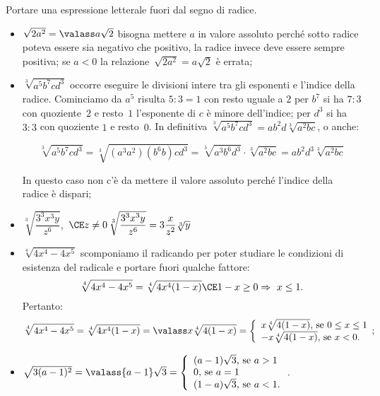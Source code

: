 \begin{exrig}
 \begin{esempio}
 Portare una espressione letterale fuori dal segno di radice.
\begin{itemize}
 \item $\sqrt{2a^2}=\valass a\sqrt 2$ bisogna mettere $a$ in valore assoluto 
 perché sotto radice poteva essere sia negativo che positivo, la radice invece 
 deve essere sempre positiva; se $a<0$ la relazione~$\sqrt{2a^2}=a\sqrt 2$ è 
 errata;
 \item $\sqrt[3]{a^5b^7cd^3}$ occorre eseguire le divisioni intere tra gli 
 esponenti e l'indice della radice. Cominciamo da $a^5$ risulta $5:3 = 1$ con 
 resto uguale a $2$ per $b^7$ si ha $7:3$ con quoziente~$2$ e resto~$1$ 
 l'esponente di $c$ è minore dell'indice; per $d^3$ si ha $3:3$ con quoziente 
 $1$ e resto~$0$. In definitiva 
 $\sqrt[3]{a^5b^7cd^3}={ab}^2 d\sqrt[3]{a^2{bc}}$, o anche:
 
\[\sqrt[3]{a^5b^7cd^3}=\sqrt[3]{(a^3a^2)(b^6b)cd^3}=
  \sqrt[3]{a^3b^6d^3}\cdot \sqrt[3]{a^2bc}=ab^2d^3\sqrt[3]{a^2bc}\]
  
In questo caso non c'è da mettere il valore assoluto perché l'indice della 
radice è dispari;
 \item $\sqrt[3]{\dfrac{3^3x^3y}{z^6}}$,\, 
       $\CE z\neq 0\,\sqrt[3]{\dfrac{3^3x^3y}{z^6}}=3\dfrac x{z^2}\sqrt[3]y$
 \item$\sqrt[4]{4x^4-4x^5}$ 
  scomponiamo il radicando per poter studiare le condizioni di esistenza del 
  radicale e portare fuori qualche fattore: 
  \[\sqrt[4]{4x^4-4x^5}=\sqrt[4]{4x^4(1-x)} \CE 1-x\ge 0\Rightarrow \ x\le 1.\]
  Pertanto:
  \[\sqrt[4]{4x^4-4x^5}=\sqrt[4]{4x^4(1-x)}=\valass x\sqrt[4]{4(1-x)}=
    \left\{\begin{array}{l}
    x\sqrt[4]{4(1-x)}\text{, se }0\le x\le 1\\
    -x\sqrt[4]{4(1-x)}\text{, se }x<0.\end{array};\right.\]
 \item $\sqrt{3(a-1)^2}=\valass{a-1}\sqrt 3=\left\{\begin{array}{l}
 (a-1)\sqrt 3\text{, se }a>1\\
 0\text{, se }a=1\\
 (1-a)\sqrt 3\text{, se }a<1.\end{array}\right.$.
\end{itemize}
 \end{esempio}
\end{exrig}

